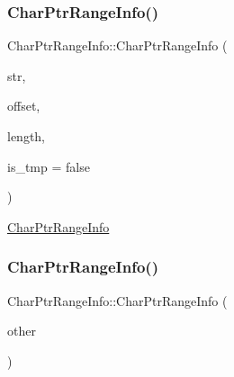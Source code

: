 \subsubsection{\texorpdfstring{Char\+Ptr\+Range\+Info()}{CharPtrRangeInfo()}\hspace{0.1cm}{\footnotesize\ttfamily [1/3]}}
{\footnotesize\ttfamily Char\+Ptr\+Range\+Info\+::\+Char\+Ptr\+Range\+Info (\begin{DoxyParamCaption}\item[{\mbox{\hyperlink{ZlibCrc32_8h_a2c212835823e3c54a8ab6d95c652660e}{const}} char $\ast$}]{str,  }\item[{\mbox{\hyperlink{ZlibCrc32_8h_a2c212835823e3c54a8ab6d95c652660e}{const}} uint32\+\_\+t}]{offset,  }\item[{\mbox{\hyperlink{ZlibCrc32_8h_a2c212835823e3c54a8ab6d95c652660e}{const}} uint32\+\_\+t}]{length,  }\item[{\mbox{\hyperlink{ZlibCrc32_8h_a2c212835823e3c54a8ab6d95c652660e}{const}} bool}]{is\+\_\+tmp = {\ttfamily false} }\end{DoxyParamCaption})}

\mbox{\hyperlink{classlucene_1_1core_1_1analysis_1_1characterutil_1_1CharPtrRangeInfo}{Char\+Ptr\+Range\+Info}} \mbox{\label{classlucene_1_1core_1_1analysis_1_1characterutil_1_1CharPtrRangeInfo_a7a6bcc19c443e90c94bdc7314aaa528a}} 
\subsubsection{\texorpdfstring{Char\+Ptr\+Range\+Info()}{CharPtrRangeInfo()}\hspace{0.1cm}{\footnotesize\ttfamily [2/3]}}
{\footnotesize\ttfamily Char\+Ptr\+Range\+Info\+::\+Char\+Ptr\+Range\+Info (\begin{DoxyParamCaption}\item[{\mbox{\hyperlink{ZlibCrc32_8h_a2c212835823e3c54a8ab6d95c652660e}{const}} \mbox{\hyperlink{classlucene_1_1core_1_1analysis_1_1characterutil_1_1CharPtrRangeInfo}{Char\+Ptr\+Range\+Info}} \&}]{other }\end{DoxyParamCaption})}

